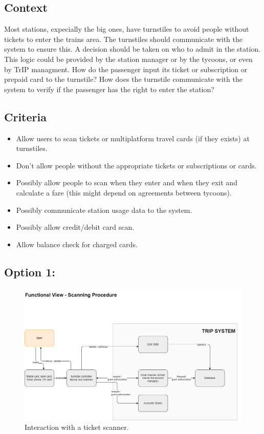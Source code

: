 \subsection*{Context}

Most stations, expecially the big ones, have turnstiles to avoid people without tickets to enter the trains area.
The turnstiles should communicate with the system to ensure this. A decision should be taken on who to admit in the station.
This logic could be provided by the station manager or by the tycoons, or even by TrIP managment.
How do the passenger input its ticket or subscription or prepaid card to the turnstile?
How does the turnstile communicate with the system to verify if the passenger has the right to enter the station?

\subsection*{Criteria}
\begin{itemize}
    \item Allow users to scan tickets or multiplatform travel cards (if they exists) at turnstiles.
    \item Don't allow people without the appropriate tickets or subscriptions or cards.
    \item Possibly allow people to scan when they enter and when they exit and calculate a fare (this might depend on agreements between tycoons). 
    \item Possibly communicate station usage data to the system.
    \item Possibly allow credit/debit card scan.
    \item Allow balance check for charged cards.
\end{itemize}

\subsection*{Option 1: }
\begin{figure}[ht]
    \centering
    \includegraphics[width=\textwidth]{drawings/views_draft2/functional_view turnstiles.png}
    \caption{Interaction with a ticket scanner.}
    \label{fig:ticket_scanner}
\end{figure}
